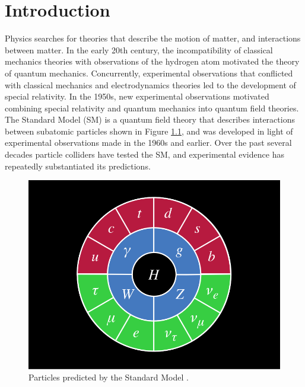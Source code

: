 \chapter{Introduction}
\label{intro_chapter}

Physics searches for theories that describe the motion of matter, and interactions between matter.  
In the early 20th century, the incompatibility of classical mechanics theories with 
observations of the hydrogen atom motivated the theory of quantum mechanics.  Concurrently, experimental 
observations that conflicted with classical mechanics and electrodynamics theories led to the development 
of special relativity.  In the 1950s, new experimental observations motivated combining special 
relativity and quantum mechanics into quantum field theories.  The Standard Model (SM) \cite{weinbergSM,salamSM} 
is a quantum field theory that describes interactions between subatomic particles shown in Figure \ref{fig:structureOfSM}, 
and was developed in light of experimental observations made in the 1960s and earlier.  Over the past 
several decades particle colliders have tested the SM, and experimental evidence has repeatedly 
substantiated its predictions.

\begin{figure}[h]
	\centering
	\includegraphics[width=1.0\textwidth]{figures/SM_particles_circularRep.png}
	\caption{Particles predicted by the Standard Model \cite{smParticles}.}
	\label{fig:structureOfSM}
\end{figure}

